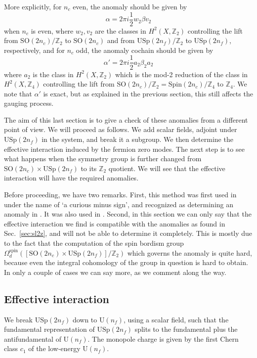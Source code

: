 \documentclass[12pt]{article}
\numberwithin{equation}{section}
\def\bZ{\mathbb{Z}}
\def\U{\mathrm{U}}
\def\SO{\mathrm{SO}}
\def\USp{\mathrm{USp}}
\def\Spin{\mathrm{Spin}}
\begin{document}
More explicitly, for $n_c$ even, the anomaly should be given by  \begin{equation}
\alpha= 2\pi i \frac12 w_2 \beta v_2
\end{equation} when $n_c$ is even,
where $w_2,v_2$ are the classes in $H^2(X,\bZ_2)$ controlling the lift from $\SO(2n_c)/\bZ_2$ to $\SO(2n_c)$
and from $\USp(2n_f)/\bZ_2$ to $\USp(2n_f)$, respectively,
and for $n_c$ odd, the anomaly cochain should be given by 
 \begin{equation}
\alpha'=2\pi i \frac12 a_2 \beta_2 a_2
\end{equation} where $a_2$ is the class in $H^2(X,\bZ_2)$ which is the mod-2 reduction of
the class in $H^2(X,\bZ_4)$ controlling the lift from $\SO(2n_c)/\bZ_2=\Spin(2n_c)/\bZ_4$ to $\bZ_4$.
We note that $\alpha'$ is exact, but as explained in the previous section, this still affects the gauging process.


The aim of this last section is to give a check of these anomalies from a different point of view.
We will proceed as follows. 
We add scalar fields, adjoint under $\USp(2n_f)$ in the system, and break it a subgroup.
We then determine the effective interaction induced by the fermion zero modes.
The next step is to see what happens when the symmetry group is further changed from $\SO(2n_c)\times \USp(2n_f)$ to its $\bZ_2$ quotient.
We will see that the effective interaction will have the required anomalies.

Before proceeding, we have two remarks.
First, this method was first used in \cite[Sec.~4]{Witten:1995gf} under the name of `a curious minus sign', and recognized as determining an anomaly in \cite[Sec.~2.4.3]{Cordova:2018acb}.
It was also used in \cite[Sec.~3.1 and Sec.~5.1.2]{Wang:2018qoy}.
Second, in this section we can only say that the effective interaction we find is compatible with the anomalies
as found in Sec.~\ref{sec:sl2z},
and will not be able to determine it completely.
This is mostly due to the fact that the computation of the spin bordism group $\Omega^\text{spin}_d([\SO(2n_c)\times \USp(2n_f)]/\bZ_2)$ which governs the anomaly is quite hard, 
because even the integral cohomology of the group in question is hard to obtain.
In only a couple of cases we can say more, as we comment along the way.

\subsection{Effective interaction}
We break $\USp(2n_f)$ down to $\U(n_f)$, using a scalar field,
such that the fundamental representation of $\USp(2n_f)$ splits to the fundamental plus the antifundamental of $\U(n_f)$.
The monopole charge is given by the first Chern class $c_1$ of the low-energy $\U(n_f)$.
\end{document}
